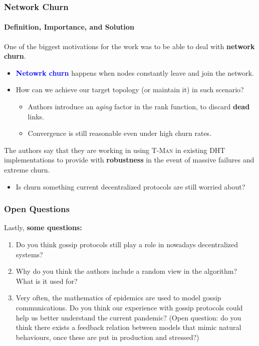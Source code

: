 \documentclass[10pt,    %
    english,            %
    xcolor=table,       %
    envcountsect,        %
    aspectratio=169     %
]{beamer}
\begin{document}
\begin{frame}
    \frametitle{Network Churn}
    \framesubtitle{Definition, Importance, and Solution}

    One of the biggest motivations for the work was to be able to deal with \textbf{network churn}.
    \begin{itemize}
        \item \textbf{\textcolor{blue}{Netowrk churn}} happens when nodes constantly leave and join the network.
        \item How can we achieve our target topology (or maintain it) in such scenario?
        \begin{itemize}
            \item Authors introduce an \textit{aging} factor in the rank function, to discard \textbf{dead} links.
            \item Convergence is still reasonable even under high churn rates.
        \end{itemize}
    \end{itemize}
    The authors say that they are working in using \textsc{T-Man} in existing DHT implementations to provide with \textbf{robustness} in the event of massive failures and extreme churn.
    \begin{itemize}
        \item Is churn something current decentralized protocols are still worried about?
    \end{itemize}
\end{frame}

\begin{frame}
    \frametitle{Open Questions}

    Lastly, \textbf{some questions:}
    \begin{enumerate}
        \item Do you think gossip protocols still play a role in nowadays decentralized systems?
        \item Why do you think the authors include a random view in the algorithm? What is it used for?
        \item Very often, the mathematics of epidemics are used to model gossip communications. Do you think our experience with gossip protocols could help us better understand the current pandemic? (Open question: do you think there exists a feedback relation between models that mimic natural behaviours, once these are put in production and stressed?)
    \end{enumerate}

\end{frame}
\end{document}

